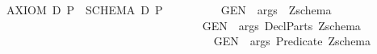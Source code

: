 \begin{isabellebody}
\ \ {\isachardoublequoteopen}{\isacharunderscore}AXIOM{}\ D\ P{\isachardoublequoteclose}\ {\isacharequal}{\isacharequal}\ {\isachardoublequoteopen}SCHEMA\ D\ P{\isachardoublequoteclose}\isanewline
\ \ \ \ \ \ \ \ \isanewline
{}\isamarkupfalse%
\isanewline
\isanewline
\ {\isachardoublequoteopen}{\isacharunderscore}GEN{}{\isachardoublequoteclose}\ {\isacharcolon}{\isacharcolon}\ {\isachardoublequoteopen}args\ {\isacharequal}{\isachargreater}\ Zschema{\isachardoublequoteclose}\ \ \isanewline
\ \ \ \ \ \ \ \ \ \ \ \ \ \ \ \ \ \ \ \ \ \ \ \ \ \ \ \ \ \ \ \ {\isacharparenleft}{\isachardoublequoteopen}{\isacharplus}{\isacharequal}{\isacharequal}\ {\isacharbrackleft}{\isacharparenleft}{\isacharunderscore}{\isacharparenright}{\isacharbrackright}\ {\isacharequal}{\isacharequal}{\isacharequal}{\isacharslash}{\isacharslash}{\isacharminus}{\isacharequal}{\isacharequal}{\isachardoublequoteclose}{\isacharparenright}\ \isanewline
\ {\isachardoublequoteopen}{\isacharunderscore}GEN{}{\isachardoublequoteclose}\ {\isacharcolon}{\isacharcolon}\ {\isachardoublequoteopen}{\isacharbrackleft}args{\isacharcomma}\ DeclParts{\isacharbrackright}{\isacharequal}{\isachargreater}\ Zschema\ {\isachardoublequoteclose}\ \isanewline
\ \ \ \ \ \ \ \ \ \ \ \ \ \ \ \ \ \ \ \ \ \ \ \ \ \ \ \ \ \ \ \ {\isacharparenleft}{\isachardoublequoteopen}{\isacharplus}{\isacharequal}{\isacharequal}\ {\isacharbrackleft}{\isacharparenleft}{\isacharunderscore}{\isacharparenright}{\isacharbrackright}\ {\isacharequal}{\isacharequal}{\isacharequal}{\isacharslash}{\isacharslash}{\isacharparenleft}{}\ {\isacharunderscore}{\isacharparenright}\ {\isacharslash}{\isacharslash}{\isacharminus}{\isacharequal}{\isacharequal}{\isachardoublequoteclose}{\isacharparenright}\ \isanewline
\ {\isachardoublequoteopen}{\isacharunderscore}GEN{}{\isachardoublequoteclose}\ {\isacharcolon}{\isacharcolon}\ {\isachardoublequoteopen}{\isacharbrackleft}args{\isacharcomma}\ Predicate{\isacharbrackright}{\isacharequal}{\isachargreater}\ Zschema{\isachardoublequoteclose}\ \ \isanewline
\ \ \ \ \ \ \ \ \ \ \ \ \ \ \ \ \ \ \ \ \ \ \ \ \ \ \ \ \ \ \ \ {\isacharparenleft}{\isachardoublequoteopen}{\isacharplus}{\isacharequal}{\isacharequal}\ {\isacharbrackleft}{\isacharparenleft}{\isacharunderscore}{\isacharparenright}{\isacharbrackright}\ {\isacharequal}{\isacharequal}{\isacharequal}{\isacharslash}{\isacharslash}{\isacharbar}{\isacharminus}{\isacharminus}{\isacharslash}{\isacharslash}{\isacharparenleft}{}\ {\isacharunderscore}{\isacharparenright}{\isacharslash}{\isacharslash}{\isacharminus}{\isacharequal}{\isacharequal}{\isachardoublequoteclose}{\isacharparenright}\ \isanewline

\end{isabellebody}
